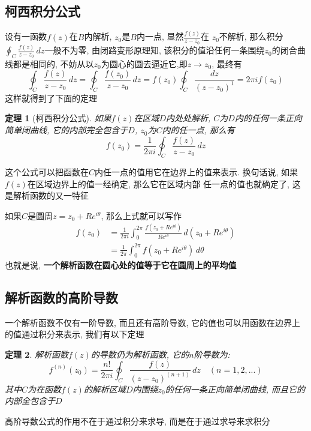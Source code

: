 \documentclass[12pt, a4paper, oneside]{ctexart}
\theoremstyle{plain}
\newtheorem{theorem}{定理}[section]
\theoremstyle{definition}
\theoremstyle{definition}
\begin{document}
\subsection{柯西积分公式}
设有一函数$f(z)$在$B$内解析, $z_0$是$B$内一点, 显然$\frac{f(z)}{z-z_0}$在
$z_0$不解析, 那么积分$\oint_{C}\frac{f(z)}{z-z_0}\,dz$一般不为零, 由闭路变形原理知, 
该积分的值沿任何一条围绕$z_0$的闭合曲线都是相同的, 不妨从以$z_0$为圆心的圆去逼近它,即$z\to z_0$, 最终有
\[
\oint_{C}\frac{f(z)}{z-z_0}\,dz=\oint_{C}\frac{f(z_0)}{z-z_0}\,dz=f(z_0)\oint_{C}\frac{dz}{(z-z_0)^1}=2\pi if(z_0)
\]
这样就得到了下面的定理
\begin{theorem}[柯西积分公式]
    如果$f(z)$在区域$D$内处处解析, $C$为$D$内的任何一条正向简单闭曲线, 它的内部完全包含于$D$, $z_0$为$C$内的任一点, 那么有
    \[
        f(z_0)=\frac{1}{2\pi i}\oint_{C}\frac{f(z)}{z-z_0}\,dz
    \]
\end{theorem}
这个公式可以把函数在$C$内任一点的值用它在边界上的值来表示. 换句话说, 如果$f(z)$在区域边界上的值一经确定, 那么它在区域内部
任一点的值也就确定了, 这是解析函数的又一特征

如果$C$是圆周$z=z_0+Re^{i\theta}$, 那么上式就可以写作
\begin{align*}
f(z_0) &= \frac{1}{2\pi i}\int_{0}^{2\pi}\frac{f(z_0+Re^{i\theta})}{Re^{i\theta}}\,d(z_0+Re^{i\theta})\\
&= \frac{1}{2\pi}\int_{0}^{2\pi}f(z_0+Re^{i\theta})\,d\theta
\end{align*}
\noindent 也就是说, \textbf{一个解析函数在圆心处的值等于它在圆周上的平均值}

\subsection{解析函数的高阶导数}
一个解析函数不仅有一阶导数, 而且还有高阶导数, 它的值也可以用函数在边界上的值通过积分来表示, 我们有以下定理
\begin{theorem}
    解析函数$f(z)$的导数仍为解析函数, 它的$n$阶导数为:
    \[
        f^{(n)}(z_0)=\frac{n!}{2\pi i}\oint_{C}\frac{f(z)}{(z-z_0)^{(n+1)}}\,dz \quad (n=1,2,...)
    \]
    其中$C$为在函数$f(z)$的解析区域$D$内围绕$z_0$的任何一条正向简单闭曲线, 而且它的内部全包含于$D$
\end{theorem}
高阶导数公式的作用不在于通过积分来求导, 而是在于通过求导来求积分
\end{document}
